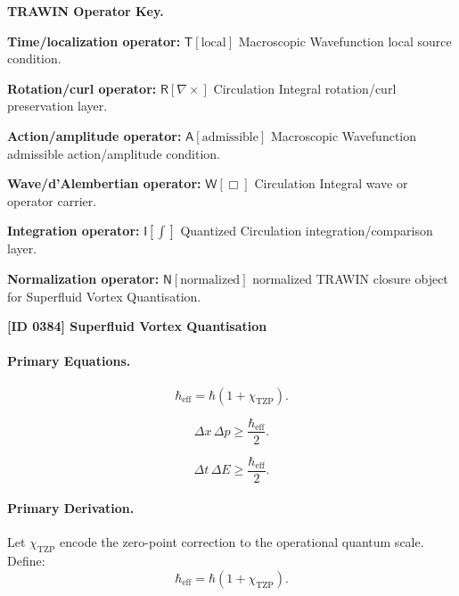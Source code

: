 \par\vspace{0.45\baselineskip}
\noindent\begin{minipage}[t]{\linewidth}
\begingroup
\small
\raggedright
\textbf{TRAWIN Operator Key.}\par
\noindent\textbf{Time/localization operator:} $\mathsf{T}\!\left[\mathrm{local}\right]$ Macroscopic Wavefunction local source condition.\par
\noindent\textbf{Rotation/curl operator:} $\mathsf{R}\!\left[\nabla\times\right]$ Circulation Integral rotation/curl preservation layer.\par
\noindent\textbf{Action/amplitude operator:} $\mathsf{A}\!\left[\mathrm{admissible}\right]$ Macroscopic Wavefunction admissible action/amplitude condition.\par
\noindent\textbf{Wave/d'Alembertian operator:} $\mathsf{W}\!\left[\Box\right]$ Circulation Integral wave or operator carrier.\par
\noindent\textbf{Integration operator:} $\mathsf{I}\!\left[\int\right]$ Quantized Circulation integration/comparison layer.\par
\noindent\textbf{Normalization operator:} $\mathsf{N}\!\left[\mathrm{normalized}\right]$ normalized TRAWIN closure object for Superfluid Vortex Quantisation.\par
\endgroup
\end{minipage}

\clearpage
\noindent\textbf{[ID 0384] Superfluid Vortex Quantisation}\par
\vspace{0.35em}
\paragraph{Primary Equations.}
\begin{equation}
\hbar_{\mathrm{eff}}
=
\hbar(1+\chi_{\mathrm{TZP}}).
\end{equation}

\begin{equation}
\Delta x\,\Delta p
\geq
\frac{\hbar_{\mathrm{eff}}}{2}.
\end{equation}

\begin{equation}
\Delta t\,\Delta E
\geq
\frac{\hbar_{\mathrm{eff}}}{2}.
\end{equation}

\paragraph{Primary Derivation.}
Let $\chi_{\mathrm{TZP}}$ encode the zero-point correction to the operational quantum scale.  
Define:
\begin{equation}
\hbar_{\mathrm{eff}}
=
\hbar(1+\chi_{\mathrm{TZP}}).
\end{equation}

